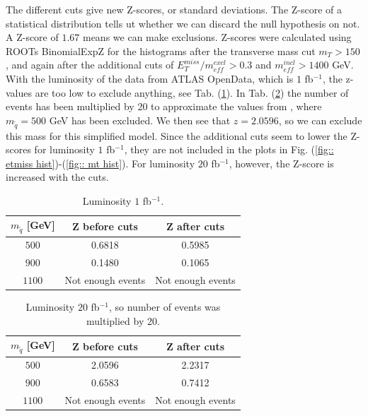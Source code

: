 \documentclass[11pt]{article}
\begin{document}
\begin{flushleft}
The different cuts give new Z-scores, or standard deviations. The Z-score of a statistical distribution tells ut whether we can discard the null hypothesis on not. A Z-score of $1.67$ means we can make exclusions. Z-scores were calculated using ROOTs BinomialExpZ for the histograms after the transverse mass cut $m_T>150$, and again after the additional cuts of $E_T^{miss}/m_{eff}^{excl} > 0.3$ and $m_{eff}^{incl}> 1400$ GeV. With the luminosity of the data from ATLAS OpenData, which is $1$ fb$^{-1}$, the z-values are too low to exclude anything, see Tab. (\ref{tab:: z 1fb}). In Tab. (\ref{tab:: z 20fb}) the number of events has been multiplied by 20 to approximate the values from \cite{carquin2015search}, where $m_{\tilde{q}}=500$ GeV has been excluded. We then see that $z=2.0596$, so we can exclude this mass for this simplified model. Since the additional cuts seem to lower the Z-scores for luminosity $1$ fb$^{-1}$, they are not included in the plots in Fig. (\ref{fig:: etmiss hist})-(\ref{fig:: mt hist}). For luminosity $20$ fb$^{-1}$, however, the Z-score is increased with the cuts.
\end{flushleft}
\begin{table}[H]
\centering
\begin{tabular}{|c|c|c|}
\hline
$m_{\tilde{q}}$ [GeV] & Z before cuts & Z after cuts\\
\hline
$500$ & 0.6818 & 0.5985\\
$900$ & 0.1480 & 0.1065\\
$1100$ & Not enough events & Not enough events\\
\hline
\end{tabular}
\caption{Luminosity $1$ fb$^{-1}$.}
\label{tab:: z 1fb}
\end{table}

\begin{table}[H]
\centering
\begin{tabular}{|c|c|c|}
\hline
$m_{\tilde{q}}$ [GeV] & Z before cuts & Z after cuts\\
\hline
$500$ & 2.0596 & 2.2317\\
$900$ & 0.6583 & 0.7412\\
$1100$ & Not enough events & Not enough events\\
\hline
\end{tabular}
\caption{Luminosity $20$ fb$^{-1}$, so number of events was multiplied by 20.}
\label{tab:: z 20fb}
\end{table}
\end{document}
